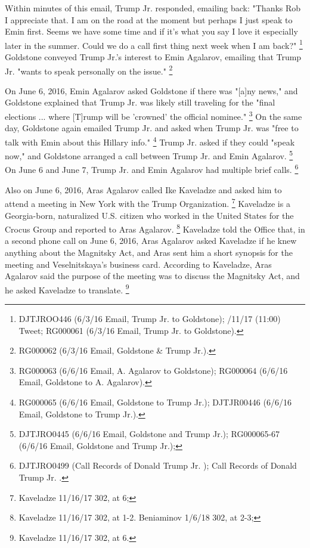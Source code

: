 Within minutes of this email, Trump Jr. responded, emailing back: "Thanks Rob I appreciate that.
I am on the road at the moment but perhaps I just speak to Emin first.
Seems we have some time and if it's what you say I love it especially later in the summer.
Could we do a call first thing next week when I am back?"%
\footnote{DJTJROO446 (6/3/16 Email, Trump Jr. to Goldstone); 
/11/17 (11:00) Tweet; 
RG000061 (6/3/16 Email, Trump Jr. to Goldstone).}
Goldstone conveyed Trump Jr.'s interest to Emin Agalarov, emailing that Trump Jr. "wants to speak personally on the issue."%
\footnote{ RG000062 (6/3/16 Email, Goldstone & Trump Jr.).}

On June 6, 2016, Emin Agalarov asked Goldstone if there was "[a]ny news," and Goldstone explained that Trump Jr. was likely still traveling for the "final elections ... where [T]rump will be 'crowned' the official nominee."%
\footnote{RG000063 (6/6/16 Email, A. Agalarov to Goldstone); 
RG000064 (6/6/16 Email, Goldstone to A. Agalarov).}
On the same day, Goldstone again emailed Trump Jr. and asked when Trump Jr. was "free to talk with Emin about this Hillary info."%
\footnote{RG000065 (6/6/16 Email, Goldstone to Trump Jr.); 
DJTJR00446 (6/6/16 Email, Goldstone to Trump Jr.).}
Trump Jr. asked if they could "speak now," and Goldstone arranged a call between Trump Jr. and Emin Agalarov.%
\footnote{DJTJRO0445 (6/6/16 Email, Goldstone and Trump Jr.); 
RG000065-67 (6/6/16 Email, Goldstone and Trump Jr.);
}
On June 6 and June 7, Trump Jr. and Emin Agalarov had multiple brief calls.%
\footnote{DJTJRO0499 (Call Records of Donald Trump Jr. );
Call Records of Donald Trump Jr. .}

Also on June 6, 2016, Aras Agalarov called Ike Kaveladze and asked him to attend a meeting in New York with the Trump Organization.%
\footnote{Kaveladze 11/16/17 302, at 6; }
Kaveladze is a Georgia-born, naturalized U.S. citizen who worked in the United States for the Crocus Group and reported to Aras Agalarov.%
\footnote{Kaveladze 11/16/17 302, at 1-2. 
 Beniaminov 1/6/18 302, at 2-3;
}
Kaveladze told the Office that, in a second phone call on June 6, 2016, Aras Agalarov asked Kaveladze if he knew anything about the Magnitsky Act, and Aras sent him a short synopsis for the meeting and Veselnitskaya's business card.
According to Kaveladze, Aras Agalarov said the purpose of the meeting was to discuss the Magnitsky Act, and he asked Kaveladze to translate.%
\footnote{Kaveladze 11/16/17 302, at 6.}

